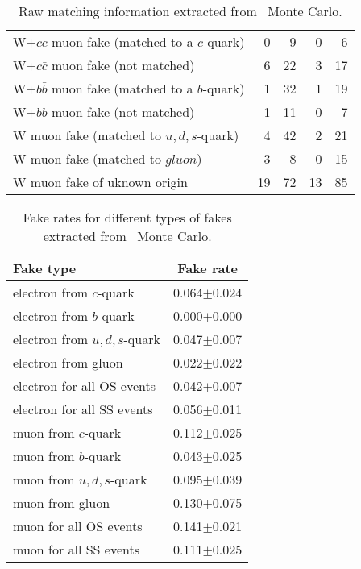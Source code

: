 \begin{table}[!t]
\begin{center}
\begin{tabular}{|l|r|r|r|r|}
                             W+$c\bar{c}$ muon fake (matched to a $c$-quark) &          0 &          9 &          0 &          6 \\
                                        W+$c\bar{c}$ muon fake (not matched) &          6 &         22 &          3 &         17 \\
                             W+$b\bar{b}$ muon fake (matched to a $b$-quark) &          1 &         32 &          1 &         19 \\
                                        W+$b\bar{b}$ muon fake (not matched) &          1 &         11 &          0 &          7 \\
                                      W muon fake (matched to $u,d,s$-quark) &          4 &         42 &          2 &         21 \\
                                            W muon fake (matched to $gluon$) &          3 &          8 &          0 &         15 \\
                                                W muon fake of uknown origin &         19 &         72 &         13 &         85 \\
\hline
\end{tabular}
\caption{Raw matching information extracted from \wjets\ Monte Carlo.} 
\label{tab:appendix_mcFakes_raw}
\end{center}
\end{table} 

\begin{table}
\begin{center}
\begin{tabular}{|l|c|}
\hline
Fake type & Fake rate \\
\hline
       electron from $c$-quark & 0.064$\pm$0.024\\
       electron from $b$-quark & 0.000$\pm$0.000\\
   electron from $u,d,s$-quark & 0.047$\pm$0.007\\
           electron from gluon & 0.022$\pm$0.022\\
    electron for all OS events & 0.042$\pm$0.007\\
    electron for all SS events & 0.056$\pm$0.011\\
\hline
           muon from $c$-quark & 0.112$\pm$0.025\\
           muon from $b$-quark & 0.043$\pm$0.025\\
       muon from $u,d,s$-quark & 0.095$\pm$0.039\\
               muon from gluon & 0.130$\pm$0.075\\
        muon for all OS events & 0.141$\pm$0.021\\
        muon for all SS events & 0.111$\pm$0.025\\
\hline
\end{tabular}
\caption{Fake rates for different types of fakes extracted from \wjets\ Monte Carlo.} 
\label{tab:appendix_mcFakes_fakerates}
\end{center}
\end{table} 
